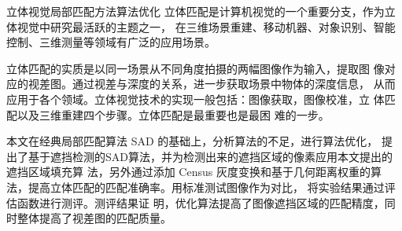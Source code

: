 \begin{Cabstract}{立体视觉}{局部匹配方法}{算法优化}{}{}
立体匹配是计算机视觉的一个重要分支，作为立体视觉中研究最活跃的主题之一，
在三维场景重建、移动机器、对象识别、智能控制、三维测量等领域有广泛的应用场景。 

立体匹配的实质是以同一场景从不同角度拍摄的两幅图像作为输入，提取图
像对应的视差图。通过视差与深度的关系，进一步获取场景中物体的深度信息，
从而应用于各个领域。立体视觉技术的实现一般包括：图像获取，图像校准，立
体匹配以及三维重建四个步骤。立体匹配是最重要也是最困
难的一步。

本文在经典局部匹配算法 SAD 的基础上，分析算法的不足，进行算法优化，
提出了基于遮挡检测的SAD算法，并为检测出来的遮挡区域的像素应用本文提出的遮挡区域填充算
法，另外通过添加 Census 灰度变换和基于几何距离权重的算法，提高立体匹配的匹配准确率。用标准测试图像作为对比，
将实验结果通过评估函数进行测评。测评结果证
明，优化算法提高了图像遮挡区域的匹配精度，同时整体提高了视差图的匹配质量。
\end{Cabstract}

